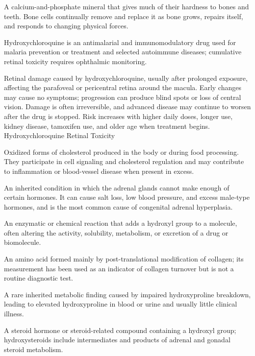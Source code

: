  A calcium-and-phosphate mineral that gives much of their hardness to bones and teeth. Bone cells continually remove and replace it as bone grows, repairs itself, and responds to changing physical forces.

 Hydroxychloroquine is an antimalarial and immunomodulatory drug used for malaria prevention or treatment and selected autoimmune diseases; cumulative retinal toxicity requires ophthalmic monitoring.

 Retinal damage caused by hydroxychloroquine, usually after prolonged exposure, affecting the parafoveal or pericentral retina around the macula. Early changes may cause no symptoms; progression can produce blind spots or loss of central vision. Damage is often irreversible, and advanced disease may continue to worsen after the drug is stopped. Risk increases with higher daily doses, longer use, kidney disease, tamoxifen use, and older age when treatment begins.
\synonyms
Hydroxychloroquine Retinal Toxicity

 Oxidized forms of cholesterol produced in the body or during food processing. They participate in cell signaling and cholesterol regulation and may contribute to inflammation or blood-vessel disease when present in excess.

 An inherited condition in which the adrenal glands cannot make enough of certain hormones. It can cause salt loss, low blood pressure, and excess male-type hormones, and is the most common cause of congenital adrenal hyperplasia.

 An enzymatic or chemical reaction that adds a hydroxyl group to a molecule, often altering the activity, solubility, metabolism, or excretion of a drug or biomolecule.

 An amino acid formed mainly by post-translational modification of collagen; its measurement has been used as an indicator of collagen turnover but is not a routine diagnostic test.

 A rare inherited metabolic finding caused by impaired hydroxyproline breakdown, leading to elevated hydroxyproline in blood or urine and usually little clinical illness.

 A steroid hormone or steroid-related compound containing a hydroxyl group; hydroxysteroids include intermediates and products of adrenal and gonadal steroid metabolism.

